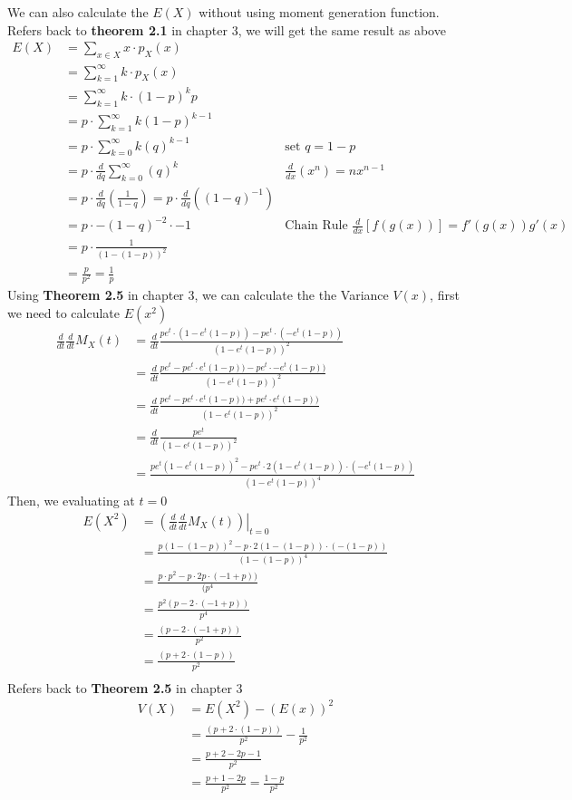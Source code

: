 \documentclass[11pt,oneside]{book}
\theoremstyle{break}
\theoremstyle{break}
\begin{document}
We can also calculate the $E(X)$ without using moment generation function. Refers back to \textbf{theorem 2.1} in chapter 3, we will get the same result as above\\
\begin{align*}
E(X)&=\sum_{x\in X}x\cdot p_X(x)\\
&=\sum_{k=1}^{\infty}k\cdot p_X(x)\\
&=\sum_{k=1}^{\infty}k\cdot (1-p)^kp\\
&=p\cdot \sum_{k=1}^{\infty}k(1-p)^{k-1}\\
&=p\cdot  \sum_{k=0}^{\infty}k(q)^{k-1}&\text{set }q=1-p\\
&=p\cdot  \frac{d}{dq} \sum_{k=0}^{\infty}(q)^{k}& \frac{d}{dx}(x^n)=nx^{n-1}\\
&=p\cdot \frac{d}{dq} \left( \frac{1}{1-q}\right)=p\cdot \frac{d}{dq} \left( (1-q)^{-1}\right)\\
&=p\cdot -(1-q)^{-2}\cdot -1 &\text{Chain Rule } \frac{d}{dx}[f(g(x))]=f'(g(x))g'(x)\\
&=p\cdot \frac{1}{(1-(1-p))^2}\\
&=\frac{p}{p^2}=\frac{1}{p}
\end{align*}
Using \textbf{Theorem 2.5} in chapter 3, we can calculate the the Variance $V(x)$, first we need to calculate $E(x^2)$\begin{align*}
\frac{d}{dt}\frac{d}{dt}M_X(t)&=\frac{d}{dt}\frac{ pe^{t}\cdot (1-e^t(1-p))-pe^t\cdot (-e^t(1-p))}{(1-e^t(1-p))^2} \\
&=\frac{d}{dt}\frac{ pe^{t}-pe^t\cdot e^t(1-p))-pe^t\cdot -e^t (1-p))}{(1-e^t(1-p))^2} \\
&=\frac{d}{dt}\frac{ pe^{t}-pe^t\cdot e^t(1-p))+pe^t\cdot e^t (1-p))}{(1-e^t(1-p))^2} \\
&=\frac{d}{dt}\frac{ pe^{t}}{(1-e^t(1-p))^2} \\
&=\frac{pe^t(1-e^t(1-p))^2-pe^t\cdot 2(1-e^t(1-p))\cdot (-e^t(1-p))}{(1-e^t(1-p))^4}
\end{align*}
Then, we evaluating at $t=0$\begin{align*}
E(X^2)&=\left. \left(\frac{d}{dt} \frac{d}{dt}M_X(t)\right) \right|_{t=0}\\
&=\frac{p(1-(1-p))^2-p\cdot 2(1-(1-p))\cdot (-(1-p))}{(1-(1-p))^4}\\
&=\frac{p\cdot p^2-p\cdot 2p\cdot (-1+p))}{(p^4}\\
&=\frac{p^2(p-2\cdot (-1+p))}{p^4}\\
&=\frac{(p-2\cdot (-1+p))}{p^2}\\
&=\frac{(p+2\cdot (1-p))}{p^2}\\
\end{align*}
Refers back to \textbf{Theorem 2.5} in chapter 3\begin{align*}
V(X)&=E(X^2)-(E(x))^2\\
&=\frac{(p+2\cdot (1-p))}{p^2}-\frac{1}{p^2}\\
&=\frac{p+2-2p-1}{p^2}\\
&=\frac{p+1-2p}{p^2}=\frac{1-p}{p^2}
\end{align*}
\end{document}
